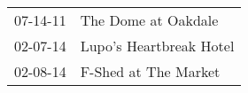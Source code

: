 \begin{supertabular}{p{0.07\textwidth}p{0.23\textwidth}}
 07-14-11 &      The Dome at Oakdale \\
 02-07-14 &  Lupo's Heartbreak Hotel \\
 02-08-14 &     F-Shed at The Market \\
\end{supertabular}
